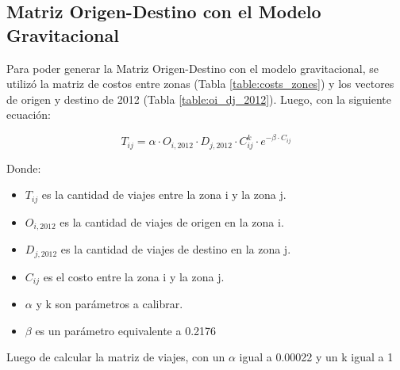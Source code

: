 \documentclass[letterpaper,12pt]{article}
\begin{document}
\subsection{Matriz Origen-Destino con el Modelo Gravitacional}
Para poder generar la Matriz Origen-Destino con el modelo gravitacional, se utilizó la matriz de costos entre zonas (Tabla \ref{table:costs_zones}) y los vectores de origen y destino de 2012 (Tabla \ref{table:oi_dj_2012}). Luego, con la siguiente ecuación: 

\begin{equation}
    T_{ij} = \alpha \cdot O_{i,2012} \cdot D_{j,2012} \cdot C_{ij}^k \cdot e^{-\beta \cdot C_{ij}}
\end{equation}

Donde:
\begin{itemize}
    \item $T_{ij}$ es la cantidad de viajes entre la zona i y la zona j.
    \item $O_{i,2012}$ es la cantidad de viajes de origen en la zona i.
    \item $D_{j,2012}$ es la cantidad de viajes de destino en la zona j.
    \item $C_{ij}$ es el costo entre la zona i y la zona j.
    \item $\alpha$ y k son parámetros a calibrar.
    \item $\beta$ es un parámetro equivalente a 0.2176
\end{itemize}


Luego de calcular la matriz de viajes, con un $\alpha$ igual a 0.00022 y un k igual a 1
\newpage
\end{document}
